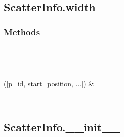 \documentclass[letterpaper,10pt,english]{sphinxmanual}
\begin{document}
\begin{fulllineitems}
\subsection{ScatterInfo.width}
\label{\detokenize{generated/quality_assessment.data_types.ScatterInfo.width:scatterinfo-width}}\label{\detokenize{generated/quality_assessment.data_types.ScatterInfo.width::doc}}

\begin{fulllineitems}
\label{\detokenize{generated/quality_assessment.data_types.ScatterInfo.width:quality_assessment.data_types.ScatterInfo.width}}
\end{fulllineitems}

\subsubsection*{Methods}


\begin{savenotes}\sphinxatlongtablestart\begin{longtable}[c]{}
\hline

\endfirsthead

%
{}\\
\hline

\endhead

\hline
{}\\
\endfoot

\endlastfoot

\sphinxAtStartPar
{\hyperref[\detokenize{generated/quality_assessment.data_types.ScatterInfo.__init__:quality_assessment.data_types.ScatterInfo.__init__}]{}}({[}p\_id, start\_position, ...{]})
&
\sphinxAtStartPar

\\
\hline
\end{longtable}\sphinxatlongtableend\end{savenotes}


\subsection{ScatterInfo.\_\_init\_\_}
\label{\detokenize{generated/quality_assessment.data_types.ScatterInfo.__init__:scatterinfo-init}}\label{\detokenize{generated/quality_assessment.data_types.ScatterInfo.__init__::doc}}


\end{fulllineitems}
\end{document}
